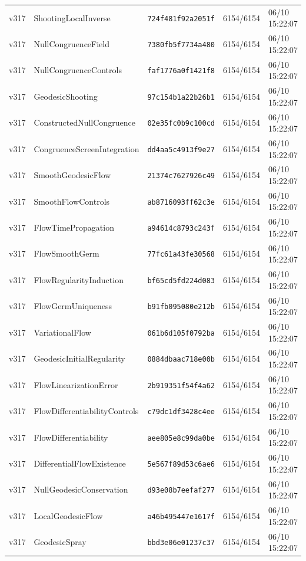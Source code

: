 \documentclass[11pt]{article}
\theoremstyle{definition}\newtheorem{deriv}{Derivação}
\begin{document}
{\begin{longtable}{@{}lllll@{}}
v317 & ShootingLocalInverse & \texttt{724f481f92a2051f} & 6154/6154 & 06/10 15:22:07 \\
v317 & NullCongruenceField & \texttt{7380fb5f7734a480} & 6154/6154 & 06/10 15:22:07 \\
v317 & NullCongruenceControls & \texttt{faf1776a0f1421f8} & 6154/6154 & 06/10 15:22:07 \\
v317 & GeodesicShooting & \texttt{97c154b1a22b26b1} & 6154/6154 & 06/10 15:22:07 \\
v317 & ConstructedNullCongruence & \texttt{02e35fc0b9c100cd} & 6154/6154 & 06/10 15:22:07 \\
v317 & CongruenceScreenIntegration & \texttt{dd4aa5c4913f9e27} & 6154/6154 & 06/10 15:22:07 \\
v317 & SmoothGeodesicFlow & \texttt{21374c7627926c49} & 6154/6154 & 06/10 15:22:07 \\
v317 & SmoothFlowControls & \texttt{ab8716093ff62c3e} & 6154/6154 & 06/10 15:22:07 \\
v317 & FlowTimePropagation & \texttt{a94614c8793c243f} & 6154/6154 & 06/10 15:22:07 \\
v317 & FlowSmoothGerm & \texttt{77fc61a43fe30568} & 6154/6154 & 06/10 15:22:07 \\
v317 & FlowRegularityInduction & \texttt{bf65cd5fd224d083} & 6154/6154 & 06/10 15:22:07 \\
v317 & FlowGermUniqueness & \texttt{b91fb095080e212b} & 6154/6154 & 06/10 15:22:07 \\
v317 & VariationalFlow & \texttt{061b6d105f0792ba} & 6154/6154 & 06/10 15:22:07 \\
v317 & GeodesicInitialRegularity & \texttt{0884dbaac718e00b} & 6154/6154 & 06/10 15:22:07 \\
v317 & FlowLinearizationError & \texttt{2b919351f54f4a62} & 6154/6154 & 06/10 15:22:07 \\
v317 & FlowDifferentiabilityControls & \texttt{c79dc1df3428c4ee} & 6154/6154 & 06/10 15:22:07 \\
v317 & FlowDifferentiability & \texttt{aee805e8c99da0be} & 6154/6154 & 06/10 15:22:07 \\
v317 & DifferentialFlowExistence & \texttt{5e567f89d53c6ae6} & 6154/6154 & 06/10 15:22:07 \\
v317 & NullGeodesicConservation & \texttt{d93e08b7eefaf277} & 6154/6154 & 06/10 15:22:07 \\
v317 & LocalGeodesicFlow & \texttt{a46b495447e1617f} & 6154/6154 & 06/10 15:22:07 \\
v317 & GeodesicSpray & \texttt{bbd3e06e01237c37} & 6154/6154 & 06/10 15:22:07 \\

\end{longtable}}
\end{document}
